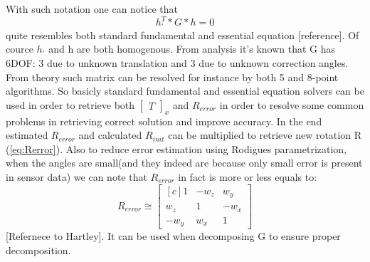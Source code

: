 With such notation one can notice that
\begin{equation} \label{eq:alternativeEnhancedEquation}
{h}_{'}^{T} * G * h = 0
\end{equation}
quite resembles both standard fundamental and essential equation [reference]. Of cource $h_{'}$ and h are both homogenous. From analysis it's known that G has 6DOF: 3 due to unknown translation and 3 due to unknown correction angles. From theory such matrix can be resolved for instance by both 5 and 8-point algorithms. So basicly standard fundamental and essential equation solvers can be used in order to retrieve both $\begin{bmatrix}T\end{bmatrix}_{x}$ and $R_{error}$ in order to resolve some common problems in retrieving correct solution and improve accuracy. 
In the end estimated $R_{error}$ and calculated $R_{init}$ can be multiplied to retrieve new rotation R (\ref{eq:Rerror}).
Also to reduce error estimation using Rodigues parametrization, when the angles are small(and they indeed are because only small error is present in sensor data) we can note that $R_{error}$ in fact is more or less equals to:
\begin{equation}
R_{error} \cong 
\begin{bmatrix*}[c]
 1& -w_{z}  &w_{y}\\ 
 w_{z} &1  & -w_{x}\\
  -w_{y}&  w_{x}&1
\end{bmatrix*}
\end{equation} 
[Refernece to Hartley]. It can be used when decomposing G to ensure proper decomposition.
